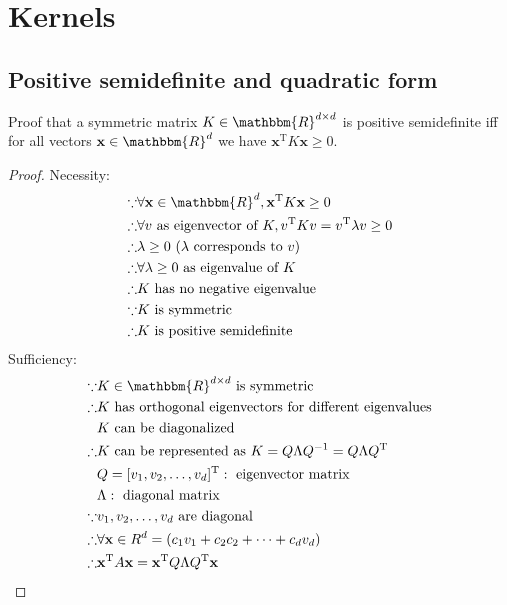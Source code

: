 \documentclass[a4paper]{article}
\begin{document}
\section{Kernels}

\subsection{Positive semidefinite and quadratic form}

Proof that a symmetric matrix $K\in\mathbbm{R}^{d\times d}$ is positive semidefinite iff for all vectors $\mathbf{x}\in\mathbbm{R}^d$ we have $\mathbf{x}^\mathrm{T}K\mathbf{x}\ge0$.

\begin{proof}
    Necessity:
    \begin{align*}
        \because&\forall \mathbf{x}\in\mathbbm{R}^d, \mathbf{x}^\mathrm{T}K\mathbf{x}\ge0\\
        \therefore&\forall v \text{ as eigenvector of } K, v^\mathrm{T}Kv=v^\mathrm{T}\lambda v\ge0\\
        \therefore&\lambda\ge0\text{ ($\lambda$ corresponds to $v$)}\\
        \therefore&\forall\lambda\ge0\text{ as eigenvalue of } K\\
        \therefore&K\text{ has no negative eigenvalue}\\
        \because&K\text{ is symmetric}\\
        \therefore&K\text{ is positive semidefinite}
    \end{align*}
    \quad\quad\quad Sufficiency:
    \begin{align*}
        \because&K\in\mathbbm{R}^{d\times d}\text{ is symmetric}\\
        \therefore&K\text{ has orthogonal eigenvectors for different eigenvalues}\\
        &K\text{ can be diagonalized}\\
        \therefore&K\text{ can be represented as }K=Q\Lambda Q^{-1}=Q\Lambda Q^\mathrm{T}\\
        &Q=[v_1,v_2,\dots,v_d]^\mathrm{T}:\text{ eigenvector matrix}\\
        &\Lambda:\text{ diagonal matrix}\\
        \because&v_1,v_2,\dots,v_d\text{ are diagonal}\\
        \therefore&\forall\mathbf{x}\in R^d=(c_1v_1+c_2c_2+\dots+c_dv_d)\\
        \therefore&\mathbf{x}^\mathrm{T}A\mathbf{x}=\mathbf{x}^\mathrm{T}Q\Lambda Q^\mathrm{T}\mathbf{x}\\

\end{align*}
\end{proof}
\end{document}
